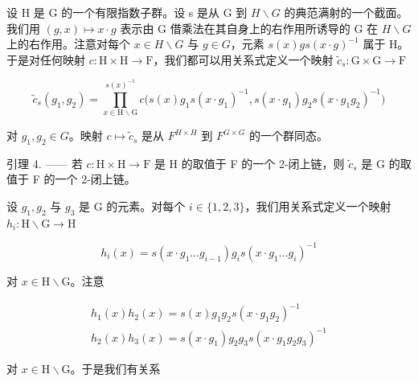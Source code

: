 设 H 是 G 的一个有限指数子群。设 s 是从 G 到 \(H\backslash G\) 的典范满射的一个截面。我们用 \((g,x)\mapsto x\cdot g\) 表示由 G 借乘法在其自身上的右作用所诱导的 G 在 \(H\backslash G\) 上的右作用。注意对每个 \(x\in H\backslash G\) 与 \(g\in G\)，元素 \(s(x)gs(x\cdot g)^{-1}\) 属于 H。于是对任何映射 \(c: \mathrm{H} \times \mathrm{H} \to \mathrm{F}\)，我们都可以用关系式定义一个映射 \(\widetilde{c}_s: \mathrm{G} \times \mathrm{G} \to \mathrm{F}\)

\[
\widetilde {c} _ {s} (g _ {1}, g _ {2}) = \prod_ {x \in \mathrm{H} \backslash \mathrm{G}} ^ {s (x) ^ {- 1}} c \bigl (s (x) g _ {1} s (x \cdot g _ {1}) ^ {- 1}, s (x \cdot g _ {1}) g _ {2} s (x \cdot g _ {1} g _ {2}) ^ {- 1} \bigr)
\]

对 \(g_{1}, g_{2} \in G\)。映射 \(c \mapsto \widetilde{c}_{s}\) 是从 \(F^{H \times H}\) 到 \(F^{G \times G}\) 的一个群同态。

引理 4. —— 若 \(c: \mathrm{H} \times \mathrm{H} \to \mathrm{F}\) 是 H 的取值于 F 的一个 2-闭上链，则 \(\widetilde{c}_s\) 是 G 的取值于 F 的一个 2-闭上链。

设 \(g_1, g_2\) 与 \(g_3\) 是 G 的元素。对每个 \(i \in \{1, 2, 3\}\)，我们用关系式定义一个映射 \(h_i: \mathrm{H} \backslash \mathrm{G} \to \mathrm{H}\)

\[
h _ {i} (x) = s \left(x \cdot g _ {1} \dots g _ {i - 1}\right) g _ {i} s \left(x \cdot g _ {1} \dots g _ {i}\right) ^ {- 1}
\]

对 \(x\in \mathrm{H}\backslash \mathrm{G}\)。注意

\[
\begin{array}{l} {h _ {1} (x) h _ {2} (x) = s (x) g _ {1} g _ {2} s (x \cdot g _ {1} g _ {2}) ^ {- 1}} \\ {h _ {2} (x) h _ {3} (x) = s (x \cdot g _ {1}) g _ {2} g _ {3} s (x \cdot g _ {1} g _ {2} g _ {3}) ^ {- 1}} \end{array}
\]

对 \(x \in \mathrm{H} \backslash \mathrm{G}\)。于是我们有关系


